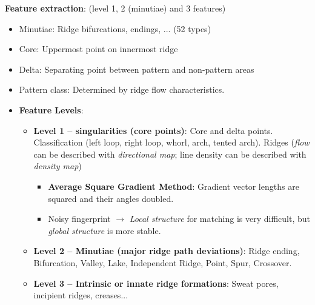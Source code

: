 \documentclass[a4paper]{article}
\begin{document}
      \textbf{Feature extraction}: (level 1, 2 (minutiae) and 3 features)
      \begin{itemize}
        \item Minutiae: Ridge bifurcations, endings, ... (52 types)
        \item Core: Uppermost point on innermost ridge
        \item Delta: Separating point between pattern and non-pattern areas
        \item Pattern class: Determined by ridge flow characteristics.
        \item\textbf{Feature Levels}:
        \begin{itemize}
          \item \textbf{Level 1 -- singularities (core points)}: Core and delta points. Classification (left loop, right loop, whorl, arch, tented arch). Ridges (\emph{flow} can be described with \emph{directional map}; line density can be described with \emph{density map})
          \begin{itemize}
            \item \textbf{Average Square Gradient Method}: Gradient vector lengths are squared and their angles doubled.
            \item Noisy fingerprint $\rightarrow$ \emph{Local structure} for matching is very difficult, but \emph{global structure} is more stable.
          \end{itemize}
          \item \textbf{Level 2 -- Minutiae (major ridge path deviations)}: Ridge ending, Bifurcation, Valley, Lake, Independent Ridge, Point, Spur, Crossover.
          \item \textbf{Level 3 -- Intrinsic or innate ridge formations}: Sweat pores, incipient ridges, creases...
        \end{itemize}
      \end{itemize}
\end{document}
